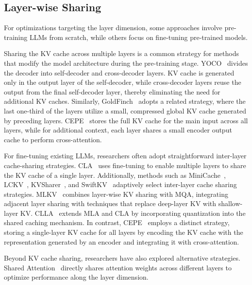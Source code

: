 \subsection{Layer-wise Sharing}\label{sec3_3}
For optimizations targeting the layer dimension, some approaches involve pre-training LLMs from scratch, while others focus on fine-tuning pre-trained models.

Sharing the KV cache across multiple layers is a common strategy for methods that modify the model architecture during the pre-training stage. YOCO~\citep{sun2024you} divides the decoder into self-decoder and cross-decoder layers. KV cache is generated only in the output layer of the self-decoder, while cross-decoder layers reuse the output from the final self-decoder layer, thereby eliminating the need for additional KV caches. Similarly, GoldFinch~\citep{goldstein2024goldfinch} adopts a related strategy, where the last one-third of the layers utilize a small, compressed global KV cache generated by preceding layers. CEPE~\citep{yen2024long} stores the full KV cache for the main input across all layers, while for additional context, each layer shares a small encoder output cache to perform cross-attention.

For fine-tuning existing LLMs, researchers often adopt straightforward inter-layer cache-sharing strategies. CLA~\citep{brandon2024reducing} uses fine-tuning to enable multiple layers to share the KV cache of a single layer. Additionally, methods such as MiniCache~\citep{liu2024minicache}, LCKV~\citep{wu2024layer}, KVSharer~\citep{yang2024kvsharer}, and SwiftKV~\citep{qiao2024swiftkv} adaptively select inter-layer cache sharing strategies. MLKV~\citep{zuhri2024mlkv} combines layer-wise KV sharing with MQA, integrating adjacent layer sharing with techniques that replace deep-layer KV with shallow-layer KV. CLLA~\citep{yang2024lossless} extends MLA and CLA by incorporating quantization into the shared caching mechanism. In contrast, CEPE~\citep{yen2024long} employs a distinct strategy, storing a single-layer KV cache for all layers by encoding the KV cache with the representation generated by an encoder and integrating it with cross-attention.

Beyond KV cache sharing, researchers have also explored alternative strategies. Shared Attention~\citep{liao2024beyond} directly shares attention weights across different layers to optimize performance along the layer dimension.

